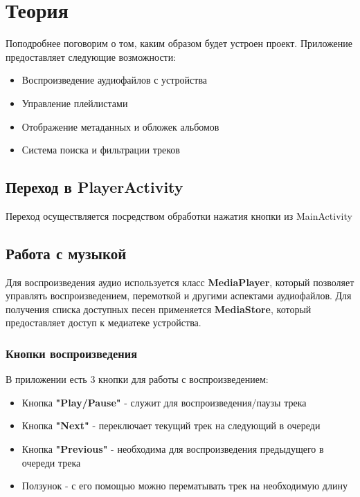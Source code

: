 \chapter{Теория}
\label{ch:chap1}

    Поподробнее поговорим о том, каким образом будет устроен проект.  Приложение предоставляет следующие возможности:
    \begin{itemize}
        \item Воспроизведение аудиофайлов с устройства
        \item Управление плейлистами
        \item Отображение метаданных и обложек альбомов
        \item Система поиска и фильтрации треков
    \end{itemize}

\section{Переход в PlayerActivity}

    Переход осуществляется посредством обработки нажатия кнопки из MainActivity
    
\section{Работа с музыкой}

Для воспроизведения аудио используется класс \textbf{MediaPlayer}, который позволяет управлять воспроизведением, перемоткой и другими аспектами аудиофайлов. Для получения списка доступных песен применяется \textbf{MediaStore}, который предоставляет доступ к медиатеке устройства.

\subsection{Кнопки воспроизведения}

    В приложении есть 3 кнопки для работы с воспроизведением:

    \begin{itemize}
    \item Кнопка \textbf{"Play/Pause"} - служит для воспроизведения/паузы трека
    \item Кнопка \textbf{"Next"} - переключает текущий трек на следующий в очереди
    \item Кнопка \textbf{"Previous"} - необходима для воспроизведения предыдущего в очереди трека
    \item Ползунок - с его помощью можно перематывать трек на необходимую длину
    \end{itemize}        

